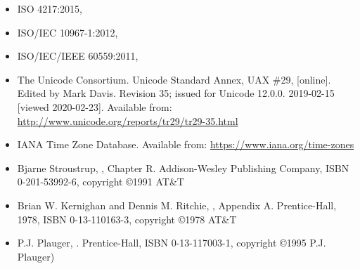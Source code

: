 \documentclass{wg21}
\begin{document}
\begin{itemize}
    \renewcommand{\labelitemi}{---}
    \item
    ISO 4217:2015,
    \item
    ISO/IEC 10967-1:2012,
    \item
    ISO/IEC/IEEE 60559:2011, 
    \item
    The Unicode Consortium. Unicode Standard Annex, UAX \#29,
     [online].
    Edited by Mark Davis. Revision 35; issued for Unicode 12.0.0. 2019-02-15 [viewed 2020-02-23].
    Available from: \url{http://www.unicode.org/reports/tr29/tr29-35.html}
    \item
    IANA Time Zone Database.
    Available from: \url{https://www.iana.org/time-zones}
    \item
    Bjarne Stroustrup,
    , Chapter R.
    Addison-Wesley Publishing Company, ISBN 0-201-53992-6, copyright \copyright 1991 AT\&T
    \item
    Brian W. Kernighan and Dennis M. Ritchie,
    , Appendix A.
    Prentice-Hall, 1978, ISBN 0-13-110163-3, copyright \copyright 1978 AT\&T
    \item
    P.J. Plauger,
    .
    Prentice-Hall, ISBN 0-13-117003-1, copyright \copyright 1995 P.J. Plauger)
\end{itemize}
\end{document}
